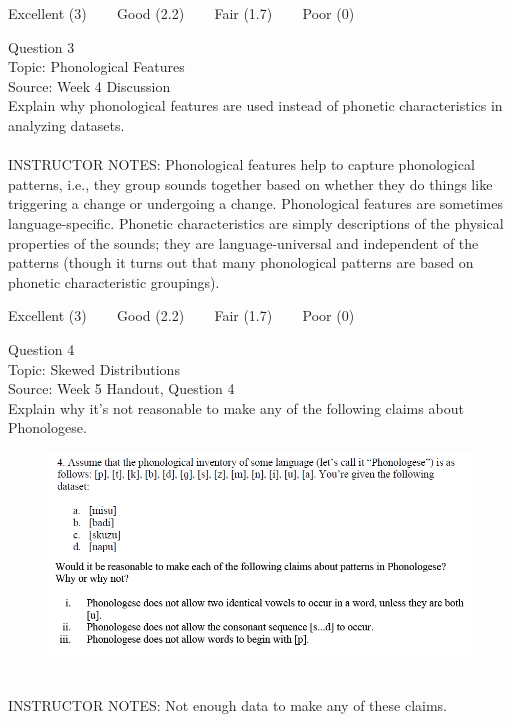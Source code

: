 \documentclass[12pt]{article}
\begin{document}
\vfill
Excellent (3) ~~~ Good (2.2) ~~~ Fair (1.7) ~~~ Poor (0)
\newpage

{\large Question 3}\\

Topic: Phonological Features\\
Source: Week 4 Discussion\\

Explain why phonological features are used instead of phonetic characteristics in analyzing datasets.\\


~\\
INSTRUCTOR NOTES: Phonological features help to capture phonological patterns, i.e., they group sounds together based on whether they do things like triggering a change or undergoing a change. Phonological features are sometimes language-specific. Phonetic characteristics are simply descriptions of the physical properties of the sounds; they are language-universal and independent of the patterns (though it turns out that many phonological patterns are based on phonetic characteristic groupings).


\vfill
Excellent (3) ~~~ Good (2.2) ~~~ Fair (1.7) ~~~ Poor (0)
\newpage

{\large Question 4}\\

Topic: Skewed Distributions\\
Source: Week 5 Handout, Question 4\\

Explain why it's not reasonable to make any of the following claims about Phonologese.\\

\begin{figure}[H]
\includegraphics{../images/Phonologese.png}
\end{figure}

~\\
INSTRUCTOR NOTES: Not enough data to make any of these claims.
\end{document}
